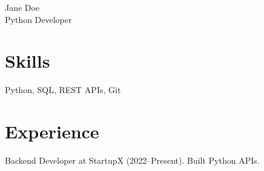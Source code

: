 \documentclass[11pt,a4paper]{article}
\begin{document}
\begin{center}
{\Large Jane Doe} \\ Python Developer
\end{center}
\section*{Skills}
Python, SQL, REST APIs, Git
\section*{Experience}
Backend Developer at StartupX (2022--Present). Built Python APIs.
\end{document}
